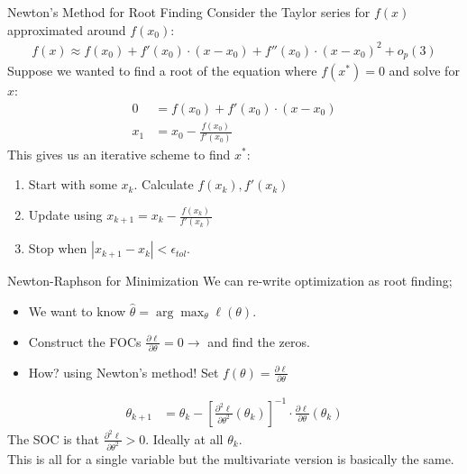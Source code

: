 \documentclass[aspectratio=169]{beamer}
\begin{document}
\begin{frame}{Newton's Method for Root Finding}
Consider the Taylor series for $f(x)$ approximated around $f(x_0)$:
\begin{align*}
f(x) \approx f(x_0) + f'(x_0) \cdot (x-x_0) + f''(x_0) \cdot (x-x_0)^2 + o_p(3)
\end{align*}
Suppose we wanted to find a \alert{root} of the equation where $f(x^{*})=0$ and solve for $x$:
\begin{align*}
0 &= f(x_0) + f'(x_0) \cdot (x-x_0) \\
x_1 &= x_0-\frac{f(x_0)}{f'(x_0)} 
\end{align*}
This gives us an \alert{iterative} scheme to find $x^{*}$:
\begin{enumerate}
\item Start with some $x_k$. Calculate $f(x_k),f'(x_k)$
\item Update using $x_{k+1} = x_k - \frac{f(x_k)}{f'(x_k)} $
\item Stop when $|x_{k+1}-x_{k}| < \epsilon_{tol}$.
\end{enumerate}
\end{frame}

\begin{frame}{Newton-Raphson for Minimization}
We can re-write \alert{optimization} as \alert{root finding};
\begin{itemize}
\item We want to know $\hat{\theta} = \arg \max_{\theta} \ell(\theta)$.
\item Construct the FOCs $\frac{\partial \ell}{\partial \theta}=0 \rightarrow$  and find the zeros.
\item How? using Newton's method! Set $f(\theta) = \frac{\partial \ell}{\partial \theta}$
\end{itemize}
\begin{align*}
\theta_{k+1} &= \theta_k -  \left[ \frac{\partial^2 \ell}{\partial \theta^2}(\theta_k) \right]^{-1} \cdot \frac{\partial \ell}{\partial \theta}(\theta_k)
\end{align*}
The SOC is that $ \frac{\partial^2 \ell}{\partial \theta^2} >0$. Ideally at all $\theta_k$.\\
This is all for a \alert{single variable} but the \alert{multivariate} version is basically the same.
\end{frame}
\end{document}
